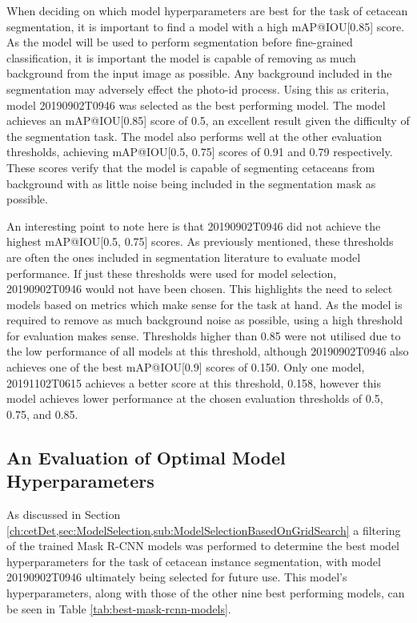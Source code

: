 When deciding on which model hyperparameters are best for the task of cetacean segmentation, it is important to find a model with a high mAP@IOU[0.85] score. As the model will be used to perform segmentation before fine-grained classification, it is important the model is capable of removing as much background from the input image as possible. Any background included in the segmentation may adversely effect the photo-id process. Using this as criteria, model 20190902T0946 was selected as the best performing model. The model achieves an mAP@IOU[0.85] score of 0.5, an excellent result given the difficulty of the segmentation task. The model also performs well at the other evaluation thresholds, achieving mAP@IOU[0.5, 0.75] scores of 0.91 and 0.79 respectively. These scores verify that the model is capable of segmenting cetaceans from background with as little noise being included in the segmentation mask as possible.

An interesting point to note here is that 20190902T0946 did not achieve the highest mAP@IOU[0.5, 0.75] scores. As previously mentioned, these thresholds are often the ones included in segmentation literature to evaluate model performance. If just these thresholds were used for model selection, 20190902T0946 would not have been chosen. This highlights the need to select models based on metrics which make sense for the task at hand. As the model is required to remove as much background noise as possible, using a high threshold for evaluation makes sense. Thresholds higher than 0.85 were not utilised due to the low performance of all models at this threshold, although 20190902T0946 also achieves one of the best mAP@IOU[0.9] scores of 0.150. Only one model, 20191102T0615 achieves a better score at this threshold, 0.158, however this model achieves lower performance at the chosen evaluation thresholds of 0.5, 0.75, and 0.85.

\subsection{An Evaluation of Optimal Model Hyperparameters}\label{ch:cetDet,sec:ModelSelection,sub:OptimalHyperparameters}

As discussed in Section \ref{ch:cetDet,sec:ModelSelection,sub:ModelSelectionBasedOnGridSearch} a filtering of the trained Mask R-CNN models was performed to determine the best model hyperparameters for the task of cetacean instance segmentation, with model 20190902T0946 ultimately being selected for future use. This model's hyperparameters, along with those of the other nine best performing models, can be seen in Table \ref{tab:best-mask-rcnn-models}.

